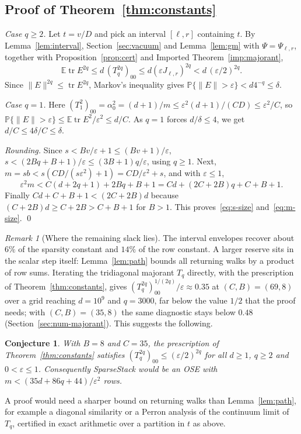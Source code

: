 \documentclass[11pt,a4paper]{article}
\newtheorem{conjecture}[theorem]{Conjecture}
\theoremstyle{definition}
\theoremstyle{remark}
\newtheorem{remark}[theorem]{Remark}
\newcommand{\E}{\mathbb E}
\newcommand{\Prob}{\mathbb P}
\newcommand{\tr}{\operatorname{tr}}
\newcommand{\eps}{\varepsilon}
\newcommand{\norm}[1]{\lVert#1\rVert}
\newcommand{\1}{\mathbf 1}
\begin{document}
\subsection{Proof of Theorem~\ref{thm:constants}}\label{sec:proof-constants}
\emph{Case $q\ge2$.} Let $t=v/D$ and pick an interval $[\ell,r]$
containing $t$. By Lemma~\ref{lem:interval}, Section~\ref{sec:vacuum} and
Lemma~\ref{lem:gm} with $\Psi=\Psi_{\ell,r}$, together with
Proposition~\ref{prop:cert} and Imported Theorem~\ref{imp:majorant},
\[
 \E\tr E^{2q}\le d\,(T_q^{2q})_{00}\le d(\eps J_{\ell,r})^{2q}
 <d\,(\eps/2)^{2q}.
\]
Since $\norm E^{2q}\le\tr E^{2q}$, Markov's inequality gives
$\Prob\{\norm E>\eps\}<d4^{-q}\le\delta$.

\emph{Case $q=1$.} Here $(T_1^2)_{00}=\alpha_0^2=(d+1)/m\le\eps^2(d+1)/(CD)
\le\eps^2/C$, so $\Prob\{\norm E>\eps\}\le\E\tr E^2/\eps^2\le d/C$.
As $q=1$ forces $d/\delta\le4$, we get $d/C\le4\delta/C\le\delta$.

\emph{Rounding.} Since $s<Bv/\eps+1\le(Bv+1)/\eps$,
$s<(2Bq+B+1)/\eps\le(3B+1)q/\eps$, using $q\ge1$. Next,
$m=sb<s(CD/(s\eps^2)+1)=CD/\eps^2+s$, and with $\eps\le1$,
\[
 \eps^2m<C(d+2q+1)+2Bq+B+1=Cd+(2C+2B)q+C+B+1.
\]
Finally $Cd+C+B+1<(2C+2B)d$ because $(C+2B)d\ge C+2B>C+B+1$ for $B>1$.
This proves~\eqref{eq:s-size} and~\eqref{eq:m-size}. \qed

\begin{remark}[Where the remaining slack lies]\label{rem:slack}
The interval envelopes recover about $6\%$ of the sparsity constant and
$14\%$ of the row constant. A larger reserve sits in the scalar step
itself: Lemma~\ref{lem:path} bounds all returning walks by a product of
row sums. Iterating the tridiagonal majorant $T_q$ directly, with the
prescription of Theorem~\ref{thm:constants}, gives
$(T_q^{2q})_{00}^{1/(2q)}/\eps\approx0.35$ at $(C,B)=(69,8)$ over a
grid reaching $d=10^9$ and $q=3000$, far below the value $1/2$ that the
proof needs; with $(C,B)=(35,8)$ the same diagnostic stays below $0.48$
(Section~\ref{sec:num-majorant}). This suggests the following.
\end{remark}

\begin{conjecture}\label{conj:C35}
With $B=8$ and $C=35$, the prescription of Theorem~\ref{thm:constants}
satisfies $(T_q^{2q})_{00}\le(\eps/2)^{2q}$ for all $d\ge1$, $q\ge2$ and
$0<\eps\le1$. Consequently SparseStack would be an OSE with
$m<(35d+86q+44)/\eps^2$ rows.
\end{conjecture}
A proof would need a sharper bound on returning walks than
Lemma~\ref{lem:path}, for example a diagonal similarity or a Perron
analysis of the continuum limit of $T_q$, certified in exact arithmetic
over a partition in $t$ as above.
\end{document}

